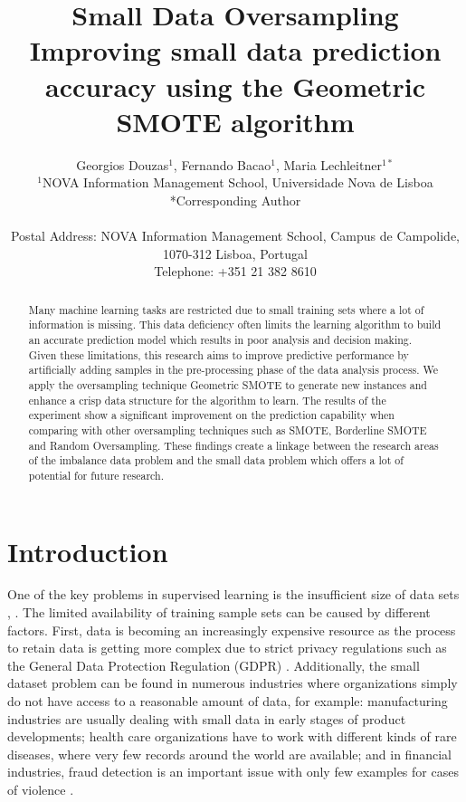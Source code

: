 \documentclass[parskip=full]{scrartcl}
\title{Small Data Oversampling  \\ \LARGE{Improving small data prediction accuracy using the Geometric SMOTE algorithm}}
\author{
	Georgios Douzas\(^{1}\), Fernando Bacao\(^{1}\), Maria Lechleitner\(^{1*}\) 
	\\
	\small{\(^{1}\)NOVA Information Management School, Universidade Nova de Lisboa}
	\\
	\small{*Corresponding Author}
	\\
	\\
	\small{Postal Address: NOVA Information Management School, Campus de Campolide, 1070-312 Lisboa, Portugal}
	\\
	\small{Telephone: +351 21 382 8610}
}
\date{}
\begin{document}
\maketitle

\begin{abstract}
Many machine learning tasks are restricted due to small training sets where a 
lot of information is missing. This data deficiency often limits the learning 
algorithm to build an accurate prediction model which results in poor analysis 
and decision making. Given these limitations, this research aims to improve 
predictive performance by artificially adding samples in the pre-processing 
phase of the data analysis process. We apply the oversampling technique 
Geometric SMOTE to generate new instances and enhance a crisp data structure 
for the algorithm to learn. The results of the experiment show a significant 
improvement on the prediction capability when comparing with other oversampling 
techniques such as SMOTE, Borderline SMOTE and Random Oversampling. These 
findings create a linkage between the research areas of the imbalance data 
problem and the small data problem which offers a lot of potential for future 
research.
\end{abstract}

\section{Introduction}
One of the key problems in supervised learning is the insufficient size of data
sets \cite{Niyogi.1998}, \cite{AbdulLateh.2017}. The limited availability of 
training sample sets can be caused by different factors. First, data is 
becoming an increasingly expensive resource \cite{Li.2007} as the process to 
retain data is getting more complex due to strict privacy regulations such as 
the General Data Protection Regulation (GDPR) \cite{EuropeanCommission.2019}. 
Additionally, the small dataset problem can be found in numerous industries 
where organizations simply do not have access to a reasonable amount of data, 
for example: manufacturing industries are usually dealing with small data in 
early stages of product developments; health care organizations have to work 
with different kinds of rare diseases, where very few records around the world 
are available; and in financial industries, fraud detection is an important 
issue with only few examples for cases of violence \cite{AbdulLateh.2017}.
\end{document}
